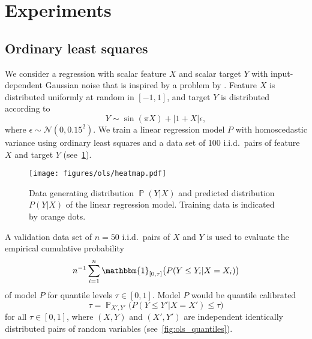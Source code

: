 \documentclass{article}
\DeclareMathOperator{\Prob}{\mathbb{P}}
\begin{document}
\clearpage

\appendix
{}
\renewcommand*{\thetheorem}{\thesection.\arabic{theorem}}
\renewcommand*{\thelemma}{\thesection.\arabic{lemma}}
\renewcommand*{\theproposition}{\thesection.\arabic{proposition}}
\renewcommand*{\thecorollary}{\thesection.\arabic{corollary}}
\renewcommand*{\thedefinition}{\thesection.\arabic{definition}}
\renewcommand*{\theexample}{\thesection.\arabic{example}}
\renewcommand*{\theremark}{\thesection.\arabic{remark}}
\makeatletter
{}
\makeatother

\section{Experiments}
\label{app:experiments}

\subsection{Ordinary least squares}\label{app:ols}

We consider a regression with scalar feature $X$ and scalar target $Y$ with input-dependent Gaussian noise
that is inspired by a problem by \citet{Gustafsson2019}. Feature $X$ is
distributed uniformly at random in $[-1, 1]$, and target $Y$ is distributed according to
\begin{equation*}
    Y \sim \sin(\pi X) + | 1 + X | \epsilon,
\end{equation*}
where $\epsilon \sim \mathcal{N}(0, 0.15^2)$. We train a linear regression model $P$ with
homoscedastic variance using ordinary least squares and a data set of 100 i.i.d.\
pairs of feature $X$ and target $Y$ (see~\cref{fig:ols_heatmap}).

\begin{figure}[hpt]
    \begin{center}
        \texttt{[image: figures/ols/heatmap.pdf]}
        \caption{Data generating distribution $\Prob(Y|X)$ and predicted distribution $P(Y|X)$ of the linear regression model.
        Training data is indicated by orange dots.}
        \label{fig:ols_heatmap}
    \end{center}
\end{figure}

A validation data set of $n = 50$ i.i.d.\ pairs of $X$ and $Y$ is used to
evaluate the empirical cumulative probability
\begin{equation*}
    n^{-1} \sum_{i=1}^n \mathbbm{1}_{[0,\tau]}\big(P(Y \leq Y_i | X = X_i)\big)
\end{equation*}
of model $P$ for quantile levels $\tau \in [0, 1]$. Model $P$ would be quantile
calibrated~\citep{Song2019}
\begin{equation*}
    \tau = \Prob_{X',Y'}\big(P(Y \leq Y' | X = X') \leq \tau \big)
\end{equation*}
for all $\tau \in [0,1]$, where $(X, Y)$ and $(X', Y')$ are independent identically
distributed pairs of random variables (see~\cref{fig:ols_quantiles}).
\end{document}
